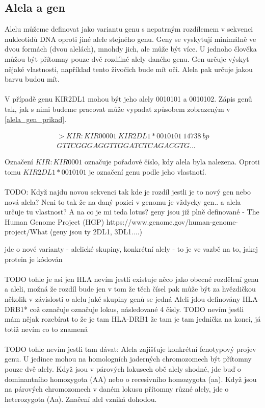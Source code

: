 \documentclass[czech,DP]{thesiskiv}
\numberwithin{equation}{section}
\begin{document}
\subsection{Alela a gen}
Alelu můžeme definovat jako variantu genu s nepatrným rozdílemem v sekvenci nukleotidů DNA oproti jiné alele stejného genu. Geny se vyskytují minimálně ve dvou formách (dvou alelách), mnohdy jich, ale může být více. U jednoho člověka můžou být přítomny pouze dvě rozdílné alely daného genu. Gen určuje výskyt nějaké vlastnosti, například tento živočich bude mít oči. Alela pak určuje jakou barvu budou mít.
\\
\\
V případě genu KIR2DL1 mohou být jeho alely 0010101 a 0010102. Zápis genů tak, jak s nimi budeme pracovat může vypadat způsobem zobrazeným v \ref{alela_gen_prikad}. 

\begin{equation}\begin{split} 
   \label{alela_gen_prikad}
   		>KIR:KIR00001\: KIR2DL1*0010101\: 14738\: bp \\
		GTTCGGGAGGTTGGATCTCAGACGTG...
\end{split}\end{equation}

\noindent 
Označení $KIR:KIR0001$ označuje pořadové číslo, kdy alela byla nalezena. Oproti tomu $KIR2DL1*0010101$ je označení genu podle jeho vlastnotí.
\\
\\ 
TODO: Když najdu novou sekvenci tak kde je rozdíl jestli je to nový gen nebo nová alela? Neni to tak že na daný pozici v genomu je vždycky gen.. a alela určuje tu vlastnost? A na co je mi teda lotus? 
geny jsou již plně definované - The Human Genome Project (HGP) https://www.genome.gov/human-genome-project/What (geny jsou ty 2DL1, 3DL1....)

jde o nové varianty - alelické skupiny, konkrétní alely - to je ve vazbě na to, jakej protein je kódován
\\
\\
TODO tohle je asi jen HLA nevím jestli existuje něco jako obecné rozdělení genu a aleli, možná že rozdíl bude jen v tom že těch čísel pak může být za hvězdičkou několik v závislosti o alelu jaké skupiny genů se jedná
Aleli jdou definovány HLA-DRB1* což označuje označuje lokus, následované 4 čísly. 
TODO nevím jestli mám nějak rozebírat to že je tam HLA-DRB1 že tam je tam jednička na konci, já totiž nevím co to znamená
\\
\\
TODO tohle nevím jestli tam dávat: 
Alela zajišťuje konkrétní fenotypový projev genu. U jedince mohou na homologních jaderných chromozomech být přítomny pouze dvě alely. Když jsou v párových lokusech obě alely shodné, jde buď o dominantního homozygota (AA) nebo o recesivního homozygota (aa). Když jsou na párových chromozomech v daném lokusu přítomny různé alely, jde o heterozygota (Aa). Značení alel vzniká dohodou.
\end{document}
